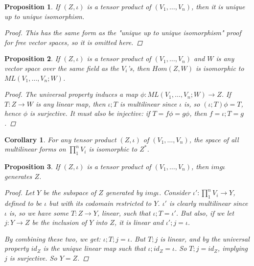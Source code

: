 \documentclass[a4paper,14pt]{article}
\newtheorem*{prop}{Proposition}
\newtheorem*{corollary}{Corollary}
\begin{document}
\begin{prop}
If $(Z, \iota)$ is a tensor product of $(V_1, \ldots, V_n)$, then it is unique up to unique isomorphism.
\begin{proof}
This has the same form as the "unique up to unique isomorphism" proof for free vector spaces, so it is omitted here.
\end{proof}
\end{prop}

\begin{prop}
If $(Z, \iota)$ is a tensor product of $(V_1, \ldots, V_n)$ and $W$ is any vector space over the same field as the $V_i$'s, then $Hom(Z, W)$ is isomorphic to $ML(V_1, \ldots, V_n; W)$.
\begin{proof}
    The universal property induces a map $\phi: ML(V_1, \ldots, V_n; W) \to Z$. If $T: Z \to W$ is any linear map, then $\iota;T$ is multilinear since $\iota$ is, so $(\iota;T) \phi = T$, hence $\phi$ is surjective. It must also be injective: if $T = f \phi = g \phi$, then $f = \iota;T = g$.
\end{proof}
\end{prop}
\begin{corollary}
For any tensor product $(Z, \iota)$ of $(V_1, \ldots, V_n)$, the space of all multilinear forms on $\prod_1^n V_i$ is isomorphic to $Z^{\ast}$.
\end{corollary}

\begin{prop}
If $(Z, \iota)$ is a tensor product of $(V_1, \ldots, V_n)$, then $img \iota$ generates $Z$.
\begin{proof}
Let $Y$ be the subspace of $Z$ generated by $img \iota$. Consider $\iota': \prod_1^n V_i \to Y$, defined to be $\iota$ but with its codomain restricted to $Y$. $\iota'$ is clearly multilinear since $\iota$ is, so we have some $T: Z \to Y$, linear, such that $\iota; T = \iota'$. But also, if we let $j: Y \to Z$ be the inclusion of $Y$ into $Z$, it is linear and $\iota'; j = \iota$. 

\begin{center}
\end{center}

By combining these two, we get: $\iota;T;j = \iota$. But $T;j$ is linear, and by the universal property $id_Z$ is the unique linear map such that $\iota; id_Z = \iota$. So $T;j = id_Z$, implying $j$ is surjective. So $Y = Z$.

\end{proof}
\end{prop}
\end{document}
